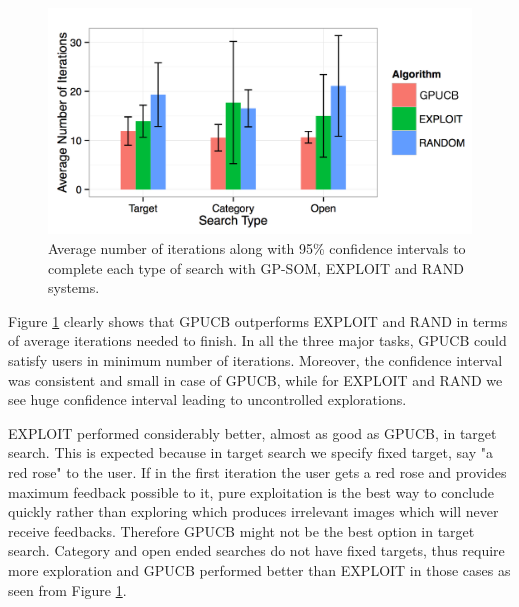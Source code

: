\documentclass[english]{tktltiki}
\begin{document}
\begin{figure}[h!]
  \centering
    \includegraphics[width=1.0\textwidth]{figures/conf_intr.png}
    \caption{Average number of iterations along with 95\% confidence intervals to complete each type of search with GP-SOM, EXPLOIT and RAND systems.}
    \label{bar_chart}
\end{figure}

Figure \ref{bar_chart} clearly shows that GPUCB outperforms EXPLOIT and RAND in terms of average iterations needed to finish. In all the three major tasks, GPUCB could satisfy users in minimum number of iterations. Moreover, the confidence interval was consistent and small in case of GPUCB, while for EXPLOIT and RAND we see huge confidence interval leading to uncontrolled explorations.

EXPLOIT performed considerably better, almost as good as GPUCB, in target search. This is expected because in target search we specify fixed target, say "a red rose" to the user. If in the first iteration the user gets a red rose and provides maximum feedback possible to it, pure exploitation is the best way to conclude quickly rather than exploring which produces irrelevant images which will never receive feedbacks. Therefore GPUCB might not be the best option in target search. Category and open ended searches do not have fixed targets, thus require more exploration and GPUCB performed better than EXPLOIT in those cases as seen from Figure \ref{bar_chart}.
\end{document}
